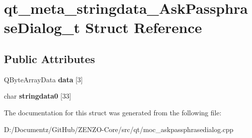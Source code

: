 \hypertarget{structqt__meta__stringdata___ask_passphrase_dialog__t}{}\section{qt\+\_\+meta\+\_\+stringdata\+\_\+\+Ask\+Passphrase\+Dialog\+\_\+t Struct Reference}
\label{structqt__meta__stringdata___ask_passphrase_dialog__t}
\subsection*{Public Attributes}
\begin{DoxyCompactItemize}
\item 
\mbox{\label{structqt__meta__stringdata___ask_passphrase_dialog__t_a5ba542b14eec43c4a652fe36b26ffb77}} 
Q\+Byte\+Array\+Data {\bfseries data} \mbox{[}3\mbox{]}
\item 
\mbox{\label{structqt__meta__stringdata___ask_passphrase_dialog__t_ad162c55b6eda8ba06c0f988c0ed60929}} 
char {\bfseries stringdata0} \mbox{[}33\mbox{]}
\end{DoxyCompactItemize}


The documentation for this struct was generated from the following file\+:\begin{DoxyCompactItemize}
\item 
D\+:/\+Documentz/\+Git\+Hub/\+Z\+E\+N\+Z\+O-\/\+Core/src/qt/moc\+\_\+askpassphrasedialog.\+cpp\end{DoxyCompactItemize}
